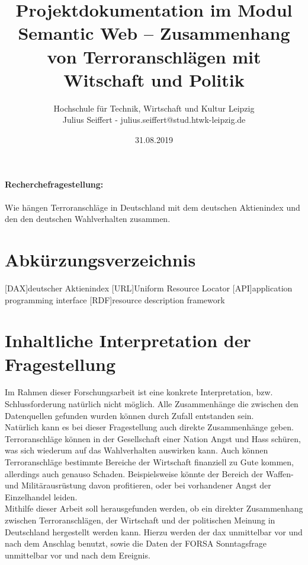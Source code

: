 \documentclass[a4paper,10pt,parskip]{article}
\title{Projektdokumentation im Modul Semantic Web -- Zusammenhang von Terroranschlägen mit Witschaft und Politik}
\author{Hochschule für Technik, Wirtschaft und Kultur Leipzig\\Julius Seiffert - julius.seiffert@stud.htwk-leipzig.de}
\date{31.08.2019}
\begin{document}
\maketitle


\paragraph{Recherchefragestellung: }
Wie hängen Terroranschläge in Deutschland mit dem deutschen Aktienindex und den den deutschen Wahlverhalten zusammen.



\newpage

\tableofcontents

\newpage

\section*{Abkürzungsverzeichnis}
\begin{acronym}
[DAX]{deutscher Aktienindex}
[URL]{Uniform Resource Locator}
[API]{application programming interface}
[RDF]{resource description framework}
\end{acronym}

\newpage

\section{Inhaltliche Interpretation der Fragestellung}

Im Rahmen dieser Forschungsarbeit ist eine konkrete Interpretation, bzw. Schlussforderung natürlich nicht möglich. Alle Zusammenhänge die zwischen den Datenquellen gefunden wurden können durch Zufall entstanden sein.\\
Natürlich kann es bei dieser Fragestellung auch direkte Zusammenhänge geben. Terroranschläge können in der Gesellschaft einer Nation Angst und Hass schüren, was sich wiederum auf das Wahlverhalten auswirken kann. Auch können Terroranschläge bestimmte Bereiche der Wirtschaft finanziell zu Gute kommen, allerdings auch genauso Schaden. Beispielsweise könnte der Bereich der Waffen- und Militärausrüstung davon profitieren, oder  bei vorhandener Angst der Einzelhandel leiden.\\
Mithilfe dieser Arbeit soll herausgefunden werden, ob ein direkter Zusammenhang zwischen Terroranschlägen, der Wirtschaft und der politischen Meinung in Deutschland hergestellt werden kann. Hierzu werden der \ac{dax} unmittelbar vor und nach dem Anschlag benutzt, sowie die Daten der FORSA Sonntagsfrage unmittelbar vor und nach dem Ereignis.
\end{document}
